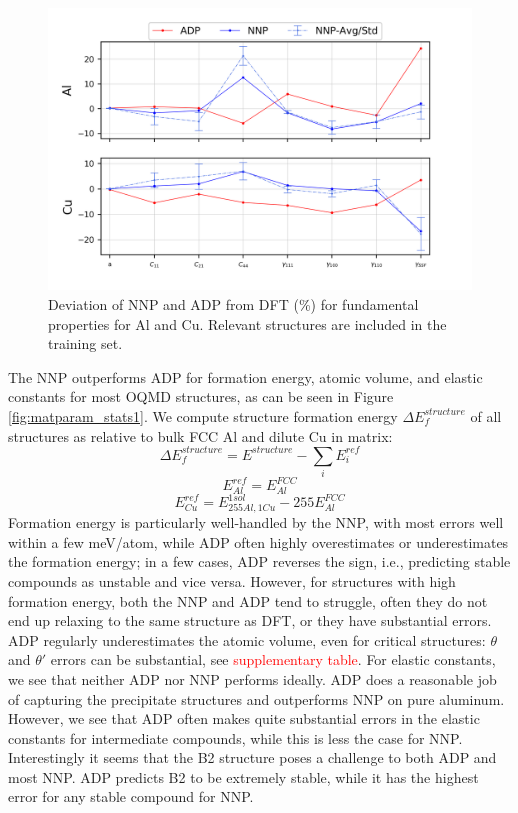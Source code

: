 \documentclass{article}
\begin{document}
\begin{figure}[H]%
\centering%
\includegraphics[width=1.2\textwidth,center]{./figures/matparam_purestats.png}%
\caption{Deviation of NNP and ADP from DFT (\%) for fundamental properties for Al and Cu. 
Relevant structures are included in the training set. }%
\label{fig:matparam_purestats}
\end{figure}
The NNP outperforms ADP for formation energy, atomic volume, and elastic constants for most OQMD structures, as can be seen in Figure \ref{fig:matparam_stats1}.
We compute structure formation energy $\Delta E^{structure}_f$ of all structures as relative to bulk FCC Al and dilute Cu in matrix:
\begin{equation} \label{eqn:formE_structure}
\Delta E^{structure}_f = E^{structure} - \sum_i E^{ref}_i
\end{equation}
\begin{equation} \label{eqn:formRef_Al}
E^{ref}_{Al} = E^{FCC}_{Al}
\end{equation}
\begin{equation} \label{eqn:formRef_Cu}
E^{ref}_{Cu} = E^{1sol}_{255Al,1Cu} - 255E^{FCC}_{Al}
\end{equation}
Formation energy is particularly well-handled by the NNP, with most errors well within a few meV/atom, while ADP often highly overestimates or underestimates the formation energy;
in a few cases, ADP reverses the sign, i.e., predicting stable compounds as unstable and vice versa.
However, for structures with high formation energy, both the NNP and ADP tend to struggle, often they do not end up relaxing to the same structure as DFT, or they have substantial errors.
ADP regularly underestimates the atomic volume, even for critical structures: $\theta$ and $\theta'$ errors can be substantial, see \textcolor{red}{supplementary table}.
For elastic constants, we see that neither ADP nor NNP performs ideally.
ADP does a reasonable job of capturing the precipitate structures and outperforms NNP on pure aluminum.
However, we see that ADP often makes quite substantial errors in the elastic constants for intermediate compounds, while this is less the case for NNP. Interestingly it seems that the B2 structure poses a challenge to both ADP and most NNP.
ADP predicts B2 to be extremely stable, while it has the highest error for any stable compound for NNP. 
\end{document}
